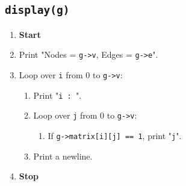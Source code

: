 {  \subsection{\texttt{display(g)}}
  \begin{enumerate}[label=\arabic*:,left=0pt]
    \item \textbf{Start}
    \item Print "Nodes = \texttt{g->v}, Edges = \texttt{g->e}".
    \item Loop over \texttt{i} from 0 to \texttt{g->v}:
          \begin{enumerate}[label=2.\arabic*:, start=1]
            \item Print "\texttt{i : }".
            \item Loop over \texttt{j} from 0 to \texttt{g->v}:
                  \begin{enumerate}[label=2.2.\arabic*:, start=1]
                    \item If \texttt{g->matrix[i][j] == 1}, print "\texttt{j}".
                  \end{enumerate}
            \item Print a newline.
          \end{enumerate}
    \item \textbf{Stop}
  \end{enumerate}

}
